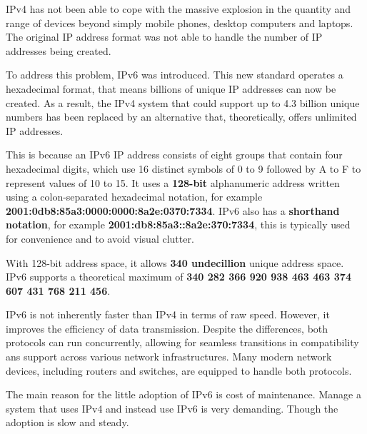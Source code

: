 IPv4 has not been able to cope with the massive explosion in the quantity and range of devices beyond simply mobile phones, desktop computers and laptops. The original IP address format was not able to handle the number of IP addresses being created.

To address this problem, IPv6 was introduced. This new standard operates a hexadecimal format, that means billions of unique IP addresses can now be created. As a result, the IPv4 system that could support up to 4.3 billion unique numbers has been replaced by an alternative that, theoretically, offers unlimited IP addresses.

This is because an IPv6 IP address consists of eight groups that contain four hexadecimal digits, which use 16 distinct symbols of 0 to 9 followed by A to F to represent values of 10 to 15. It uses a \textbf{128-bit} alphanumeric address written using a colon-separated hexadecimal notation, for example \textbf{2001:0db8:85a3:0000:0000:8a2e:0370:7334}. IPv6 also has a \textbf{shorthand notation}, for example \textbf{2001:db8:85a3::8a2e:370:7334}, this is typically used for convenience and to avoid visual clutter.

With 128-bit address space, it allows \textbf{340 undecillion} unique address space. IPv6 supports a theoretical maximum of \textbf{340 282 366 920 938 463 463 374 607 431 768 211 456}.

IPv6 is not inherently faster than IPv4 in terms of raw speed. However, it improves the efficiency of data transmission. Despite the differences, both protocols can run concurrently, allowing for seamless transitions in compatibility ans support across various network infrastructures. Many modern network devices, including routers and switches, are equipped to handle both protocols.

The main reason for the little adoption of IPv6 is cost of maintenance. Manage a system that uses IPv4 and instead use IPv6 is very demanding. Though the adoption is slow and steady.
